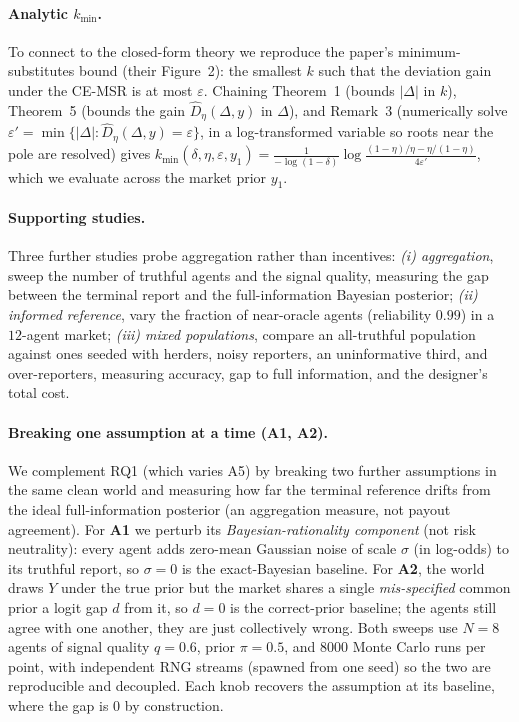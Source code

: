 \paragraph{Analytic $k_{\min}$.}
To connect to the closed-form theory we reproduce the paper's minimum-substitutes bound
(their Figure~2): the smallest $k$ such that the deviation gain under the CE-MSR is at most
$\varepsilon$. Chaining Theorem~1 (bounds $|\Delta|$ in $k$), Theorem~5 (bounds the gain
$\hat D_\eta(\Delta,y)$ in $\Delta$), and Remark~3 (numerically solve
$\varepsilon' = \min\{|\Delta| : \hat D_\eta(\Delta,y)=\varepsilon\}$, in a log-transformed
variable so roots near the pole are resolved) gives
$k_{\min}(\delta,\eta,\varepsilon,y_1) = \frac{1}{-\log(1-\delta)}\log\frac{(1-\eta)/\eta - \eta/(1-\eta)}{4\varepsilon'}$,
which we evaluate across the market prior $y_1$.

\paragraph{Supporting studies.}
Three further studies probe aggregation rather than incentives: \emph{(i) aggregation},
sweep the number of truthful agents and the signal quality, measuring the gap between the
terminal report and the full-information Bayesian posterior; \emph{(ii) informed reference},
vary the fraction of near-oracle agents (reliability $0.99$) in a $12$-agent market;
\emph{(iii) mixed populations}, compare an all-truthful population against ones seeded
with herders, noisy reporters, an uninformative third, and over-reporters, measuring
accuracy, gap to full information, and the designer's total cost.

\paragraph{Breaking one assumption at a time (A1, A2).}
We complement RQ1 (which varies A5) by breaking two further assumptions in the same clean
world and measuring how far the terminal reference drifts from the ideal full-information
posterior (an aggregation measure, not payout agreement). For \textbf{A1} we perturb its
\emph{Bayesian-rationality component} (not risk neutrality): every agent adds zero-mean
Gaussian noise of scale $\sigma$ (in log-odds) to its truthful report, so $\sigma=0$ is the
exact-Bayesian baseline. For \textbf{A2}, the world draws $Y$ under the true prior but the
market shares a single \emph{mis-specified} common prior a logit gap $d$ from it, so $d=0$ is
the correct-prior baseline; the agents still agree with one another, they are just
collectively wrong. Both sweeps use $N=8$ agents of signal quality $q=0.6$, prior $\pi=0.5$,
and $8000$ Monte Carlo runs per point, with independent RNG streams (spawned from one seed)
so the two are reproducible and decoupled. Each knob recovers the assumption at its baseline,
where the gap is $0$ by construction.


